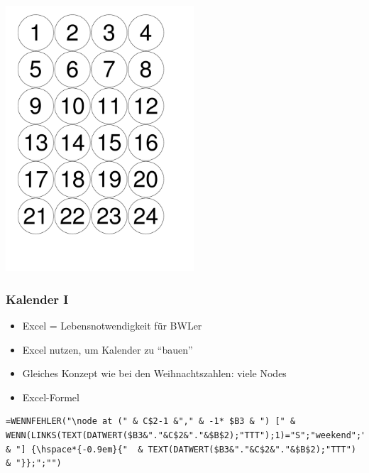 \documentclass[14pt,ngerman]{beamer}
\begin{document}
\begin{frame}

\begin{center}
\includegraphics[width=7cm]{./Examples/Weihnachtszahlen-3}
\end{center}
\end{frame}


\begin{frame}[containsverbatim]
\frametitle{Kalender I}

\begin{itemize}
	\item Excel = Lebensnotwendigkeit für BWLer
	\item Excel nutzen, um Kalender zu \enquote{bauen}
	\item Gleiches Konzept wie bei den Weihnachtszahlen: viele Nodes
	\item Excel-Formel
\end{itemize}

\begin{lstlisting}
=WENNFEHLER("\node at (" & C$2-1 &"," & -1* $B3 & ") [" & WENN(LINKS(TEXT(DATWERT($B3&"."&C$2&"."&$B$2);"TTT");1)="S";"weekend";"workday") & "] {\hspace*{-0.9em}{"  & TEXT(DATWERT($B3&"."&C$2&"."&$B$2);"TTT")   & "}};";"")
\end{lstlisting}
\end{frame}
\end{document}
